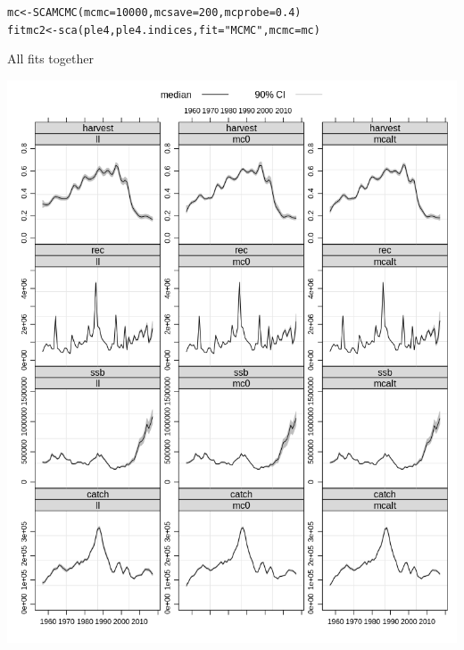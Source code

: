 \documentclass[a4paper,english,10pt]{article}\usepackage[]{graphicx}\usepackage[]{color}
\makeatletter
\newcommand{\hlnum}[1]{\textcolor[rgb]{0.063,0.58,0.627}{#1}}%
\newcommand{\hlstr}[1]{\textcolor[rgb]{0.063,0.58,0.627}{#1}}%
\newcommand{\hlstd}[1]{\textcolor[rgb]{0.196,0.196,0.196}{#1}}%
\newcommand{\hlkwb}[1]{\textcolor[rgb]{0.627,0,0.314}{#1}}%
\newcommand{\hlkwc}[1]{\textcolor[rgb]{0,0.631,0.314}{#1}}%
\newcommand{\hlkwd}[1]{\textcolor[rgb]{0.78,0.227,0.412}{#1}}%
\newenvironment{kframe}{%
 \def\at@end@of@kframe{}%
 \ifinner\ifhmode%
  \def\at@end@of@kframe{\end{minipage}}%
  \begin{minipage}{\columnwidth}%
 \fi\fi%
 \def\FrameCommand##1{\hskip\@totalleftmargin \hskip-\fboxsep
 \colorbox{shadecolor}{##1}\hskip-\fboxsep
     \hskip-\linewidth \hskip-\@totalleftmargin \hskip\columnwidth}%
 \MakeFramed {\advance\hsize-\width
   \@totalleftmargin\z@ \linewidth\hsize
   \@setminipage}}%
 {\par\unskip\endMakeFramed%
 \at@end@of@kframe}
\newenvironment{knitrout}{}{} %
\makeatother
\begin{document}
\begin{knitrout}
\color{fgcolor}\begin{kframe}
\begin{alltt}
\hlstd{mc} \hlkwb{<-} \hlkwd{SCAMCMC}\hlstd{(}\hlkwc{mcmc} \hlstd{=} \hlnum{10000}\hlstd{,} \hlkwc{mcsave} \hlstd{=} \hlnum{200}\hlstd{,} \hlkwc{mcprobe} \hlstd{=} \hlnum{0.4}\hlstd{)}
\hlstd{fitmc2} \hlkwb{<-} \hlkwd{sca}\hlstd{(ple4, ple4.indices,} \hlkwc{fit} \hlstd{=} \hlstr{"MCMC"}\hlstd{,} \hlkwc{mcmc} \hlstd{= mc)}
\end{alltt}
\end{kframe}
\end{knitrout}

All fits together

\begin{knitrout}
\color{fgcolor}

{\centering \includegraphics[width=.9\linewidth]{figure/unnamed-chunk-35-1} 

}



\end{knitrout}
\end{document}
